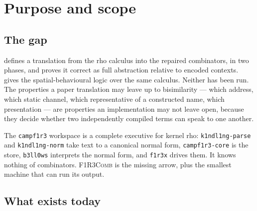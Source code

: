 \documentclass[11pt,a4paper]{article}
\newcommand{\code}[1]{\texttt{#1}}
\newcommand{\Comb}{\textsc{F1R3Comb}}
\theoremstyle{definition}
\theoremstyle{plain}
\begin{document}
\tableofcontents

\section{Purpose and scope}\label{sec:purpose}

\subsection{The gap}

\cite{draft3} defines a translation from the rho calculus into the repaired
combinators, in two phases, and proves it correct as full abstraction relative
to encoded contexts. \cite{logic} gives the spatial-behavioural logic over the
same calculus. Neither has been run. The properties a paper translation may
leave up to bisimilarity --- which address, which static channel, which
representative of a constructed name, which presentation --- are properties an
implementation may not leave open, because they decide whether two
independently compiled terms can speak to one another.

The \code{campf1r3} workspace is a complete executive for kernel rho:
\code{k1ndl1ng-parse} and \code{k1ndl1ng-norm} take text to a canonical normal
form, \code{campf1r3-core} is the store, \code{b3ll0ws} interprets the normal
form, and \code{f1r3x} drives them. It knows nothing of combinators. \Comb{}
is the missing arrow, plus the smallest machine that can run its output.

\subsection{What exists today}
\end{document}
